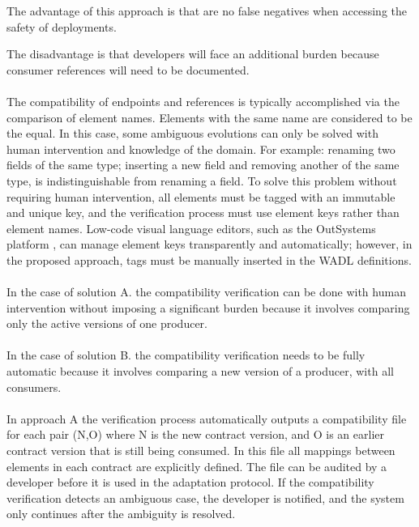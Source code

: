 The advantage of this approach is that are no false negatives when accessing the safety of deployments.

The disadvantage is that developers will face an additional burden because consumer references will need to be documented.

\paragraph{}

The compatibility of endpoints and references is typically accomplished via the comparison of element names.
Elements with the same name are considered to be the equal.
In this case, some ambiguous evolutions can only be solved with human intervention and knowledge of the domain.
For example: renaming two fields of the same type; inserting a new field and removing another of the same type, is indistinguishable from renaming a field.
To solve this problem without requiring human intervention,
all elements must be tagged with an immutable and unique key,
and the verification process must use element keys rather than element names.
Low-code visual language editors, such as the OutSystems platform \cite{golovin2017outsystems}, can manage element keys transparently and automatically;
however, in the proposed approach, tags must be manually inserted in the WADL definitions.

\paragraph{}
In the case of solution A. the compatibility verification can be done with human intervention without imposing a significant burden
because it involves comparing only the active versions of one producer.

\paragraph{}
In the case of solution B. the compatibility verification needs to be fully automatic because it involves comparing a new version of a producer, with all consumers.

\paragraph{}

In approach A the verification process automatically outputs a compatibility file for each pair (N,O) where N is the new contract version,
and O is an earlier contract version that is still being consumed.
In this file all mappings between elements in each contract are explicitly defined.
The file can be audited by a developer before it is used in the adaptation protocol.
If the compatibility verification detects an ambiguous case, the developer is notified, and the system only continues after the ambiguity is resolved.

